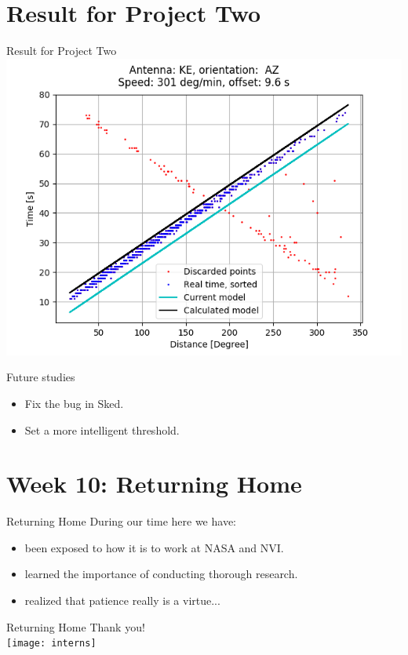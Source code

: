 \documentclass{beamer}
\begin{document}
    \section{Result for Project Two}

    \begin{frame}{Result for Project Two}
        \centering
        \includegraphics[width=1\columnwidth]{ke_az}
    \end{frame}
    \begin{frame}{Future studies}
        \begin{itemize}[<+-|alert@+>]
            \item Fix the bug in Sked.
            \item Set a more intelligent threshold.
        \end{itemize}
    \end{frame}


    \section{Week 10: Returning Home}

    \begin{frame}{Returning Home}
        During our time here we have:
        \pause
        \begin{itemize}[<+-|alert@+>]
            \item been exposed to how it is to work at NASA and NVI.
            \item learned the importance of conducting thorough research.
            \item realized that patience really is a virtue...
        \end{itemize}
    \end{frame}

    \begin{frame}{Returning Home}
        \centering
        Thank you! \\ [2ex]
        \texttt{[image: interns]}
    \end{frame}
\end{document}
